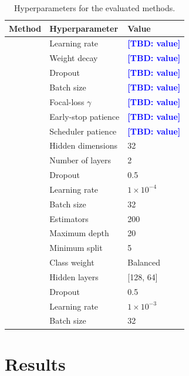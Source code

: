 \documentclass[pdflatex,sn-nature,iicol]{sn-jnl}
\newcommand{\TBD}[1]{\textcolor{blue}{\textbf{[TBD: #1]}}}
\begin{document}
\begin{table}[h]
  \caption{Hyperparameters for the evaluated methods.}
  \label{tab:hyperparameters}
  \centering
  \begin{tabular*}{\columnwidth}{@{\extracolsep{\fill}}lll@{}}
    \toprule
    Method & Hyperparameter & Value \\
    \midrule
      & Learning rate & \TBD{value} \\
      & Weight decay & \TBD{value} \\
      & Dropout & \TBD{value} \\
      & Batch size & \TBD{value} \\
      & Focal-loss $\gamma$ & \TBD{value} \\
      & Early-stop patience & \TBD{value} \\
      & Scheduler patience & \TBD{value} \\
    \midrule
      & Hidden dimensions & 32 \\
      & Number of layers & 2 \\
      & Dropout & 0.5 \\
      & Learning rate & $1\times10^{-4}$ \\
      & Batch size & 32 \\
    \midrule
      & Estimators & 200 \\
      & Maximum depth & 20 \\
      & Minimum split & 5 \\
      & Class weight & Balanced \\
    \midrule
      & Hidden layers & [128, 64] \\
      & Dropout & 0.5 \\
      & Learning rate & $1\times10^{-3}$ \\
      & Batch size & 32 \\
    \bottomrule
  \end{tabular*}
\end{table}

\section{Results}
\end{document}
